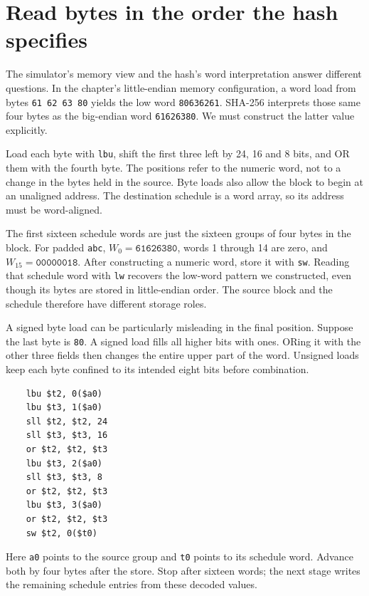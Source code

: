 \section{Read bytes in the order the hash specifies}
The simulator's memory view and the hash's word interpretation answer different
questions. In the chapter's little-endian memory configuration, a word load from bytes
\texttt{61 62 63 80} yields the low word \texttt{80636261}. SHA-256 interprets those
same four bytes as the big-endian word \texttt{61626380}. We must construct the latter
value explicitly.

Load each byte with \texttt{lbu}, shift the first three left by 24, 16 and 8 bits,
and OR them with the fourth byte. The positions refer to the numeric word, not to a
change in the bytes held in the source. Byte loads also allow the block to begin at
an unaligned address. The destination schedule is a word array, so its address must
be word-aligned.

The first sixteen schedule words are just the sixteen groups of four bytes in the
block. For padded \texttt{abc}, \(W_0=\mathtt{61626380}\), words 1 through 14 are
zero, and \(W_{15}=\mathtt{00000018}\). After constructing a numeric word, store it
with \texttt{sw}. Reading that schedule word with \texttt{lw} recovers the low-word
pattern we constructed, even though its bytes are stored in little-endian order.
The source block and the schedule therefore have different storage roles.

A signed byte load can be particularly misleading in the final position. Suppose the
last byte is \texttt{80}. A signed load fills all higher bits with ones. ORing it
with the other three fields then changes the entire upper part of the word. Unsigned
loads keep each byte confined to its intended eight bits before combination.

\begin{verbatim}
    lbu $t2, 0($a0)
    lbu $t3, 1($a0)
    sll $t2, $t2, 24
    sll $t3, $t3, 16
    or $t2, $t2, $t3
    lbu $t3, 2($a0)
    sll $t3, $t3, 8
    or $t2, $t2, $t3
    lbu $t3, 3($a0)
    or $t2, $t2, $t3
    sw $t2, 0($t0)
\end{verbatim}
Here \texttt{a0} points to the source group and \texttt{t0} points to its schedule
word. Advance both by four bytes after the store. Stop after sixteen words; the next
stage writes the remaining schedule entries from these decoded values.
